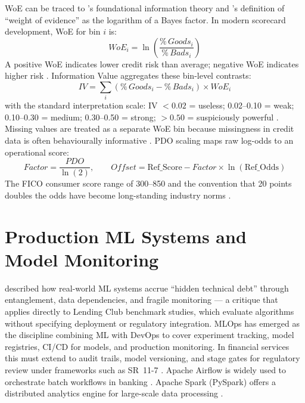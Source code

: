 \documentclass[12pt,a4paper]{report}
\begin{document}
WoE can be traced to \citet{shannon1948}'s foundational information theory and \citet{good1950}'s definition of ``weight of evidence'' as the logarithm of a Bayes factor. In modern scorecard development, WoE for bin $i$ is:
\begin{equation}
  WoE_i = \ln\!\left(\frac{\%\,Goods_i}{\%\,Bads_i}\right)
\end{equation}
A positive WoE indicates lower credit risk than average; negative WoE indicates higher risk \cite{siddiqi2006, thomas2002}. Information Value aggregates these bin-level contrasts:
\begin{equation}
  IV = \sum_i \left(\%\,Goods_i - \%\,Bads_i\right) \times WoE_i
\end{equation}
with the standard interpretation scale: IV $< 0.02$ = useless; 0.02--0.10 = weak; 0.10--0.30 = medium; 0.30--0.50 = strong; $> 0.50$ = suspiciously powerful \cite{siddiqi2006}. Missing values are treated as a separate WoE bin because missingness in credit data is often behaviourally informative \cite{lund2021}. PDO scaling maps raw log-odds to an operational score:
\begin{equation}
  Factor = \frac{PDO}{\ln(2)}, \qquad Offset = \text{Ref\_Score} - Factor \times \ln(\text{Ref\_Odds})
\end{equation}
The FICO consumer score range of 300--850 \cite{myfico} and the convention that 20 points doubles the odds have become long-standing industry norms \cite{fico_community, world_bank2020}.

\section{Production ML Systems and Model Monitoring}
\label{sec:production}

\citet{sculley2015} described how real-world ML systems accrue ``hidden technical debt'' through entanglement, data dependencies, and fragile monitoring --- a critique that applies directly to Lending Club benchmark studies, which evaluate algorithms without specifying deployment or regulatory integration. MLOps has emerged as the discipline combining ML with DevOps to cover experiment tracking, model registries, CI/CD for models, and production monitoring. In financial services this must extend to audit trails, model versioning, and stage gates for regulatory review under frameworks such as SR~11-7 \cite{mlflow2026}. Apache Airflow is widely used to orchestrate batch workflows in banking \cite{astronomer2021}. Apache Spark (PySpark) offers a distributed analytics engine for large-scale data processing \cite{spark2026}.
\end{document}
